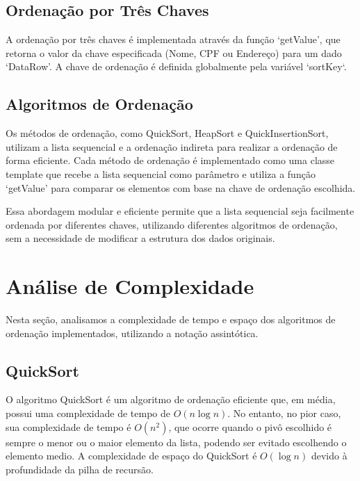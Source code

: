 \documentclass[a4paper,12pt]{article}
\begin{document}
\subsection{Ordenação por Três Chaves}
\hspace*{1cm}

A ordenação por três chaves é implementada através da função `getValue', que retorna o valor da chave especificada (Nome, CPF ou Endereço) para um dado `DataRow'. 
A chave de ordenação é definida globalmente pela variável `sortKey`.

\subsection{Algoritmos de Ordenação}
\hspace*{1cm}

Os métodos de ordenação, como QuickSort, HeapSort e QuickInsertionSort, utilizam a lista sequencial e a ordenação indireta para realizar a ordenação de forma eficiente. 
Cada método de ordenação é implementado como uma classe template que recebe a lista sequencial como parâmetro e utiliza a função `getValue' para comparar os elementos com base na chave de ordenação escolhida.

Essa abordagem modular e eficiente permite que a lista sequencial seja facilmente ordenada por diferentes chaves, utilizando diferentes algoritmos de ordenação, 
sem a necessidade de modificar a estrutura dos dados originais.

\section{Análise de Complexidade}
\hspace*{1cm}

Nesta seção, analisamos a complexidade de tempo e espaço dos algoritmos de ordenação implementados, utilizando a notação assintótica.

\subsection{QuickSort}
\hspace*{1cm}

O algoritmo QuickSort é um algoritmo de ordenação eficiente que, em média, possui uma complexidade de tempo de \(O(n \log n)\). 
No entanto, no pior caso, sua complexidade de tempo é \(O(n^2)\), que ocorre quando o pivô escolhido é sempre o menor ou o maior elemento da lista, podendo ser evitado escolhendo o elemento medio. 
A complexidade de espaço do QuickSort é \(O(\log n)\) devido à profundidade da pilha de recursão.
\end{document}
